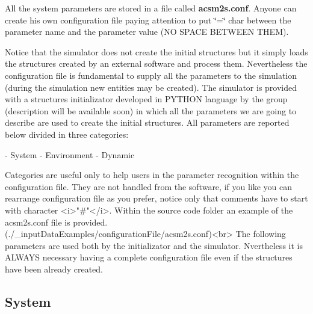  All the system parameters are stored in a file called {\bfseries acsm2s.\-conf}. Anyone can create his own configuration file paying attention to put \char`\"{}=\char`\"{} char between the parameter name and the parameter value (N\-O S\-P\-A\-C\-E B\-E\-T\-W\-E\-E\-N T\-H\-E\-M).\par
 Notice that the simulator does not create the initial structures but it simply loads the structures created by an external software and process them. Nevertheless the configuration file is fundamental to supply all the parameters to the simulation (during the simulation new entities may be created). The simulator is provided with a structures initializator developed in P\-Y\-T\-H\-O\-N language by the group (description will be available soon) in which all the parameters we are going to describe are used to create the initial structures. All parameters are reported below divided in three categories\-: \begin{DoxyVerb}          - System
          - Environment
          - Dynamic

          Categories are useful only to help users in the parameter recognition within the configuration file. They are not handled from the software, if you like you can rearrange configuration
          file as you prefer, notice only that comments have to start with character <i>"#"</i>.
          Within the source code folder an example of the acsm2s.conf file is provided. (./_inputDataExamples/configurationFile/acsm2s.conf)<br>
 The following parameters are used both by the initializator and the simulator. Nvertheless it is ALWAYS necessary having a complete configuration file even if the structures have been already created.
\end{DoxyVerb}
 \hypertarget{a00002_paramsystem}{}\subsection{System}\label{a00002_paramsystem}

